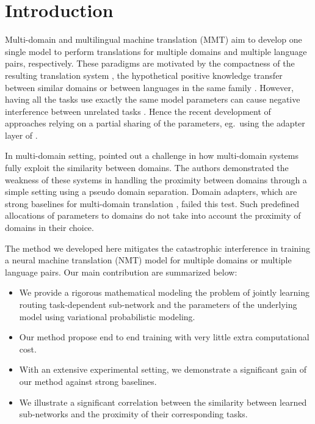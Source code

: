 \documentclass[11pt]{article}
\begin{document}
\section{Introduction}
Multi-domain and multilingual machine translation (MMT) aim to develop one single model to perform translations for multiple domains and multiple language pairs, respectively. These paradigms are motivated by the compactness of the resulting translation system \citep{dabre20survey,Chu18multilingual}, the hypothetical positive knowledge transfer between similar domains \citep{Pham21revisiting} or between languages in the same family \citep{Tan19multilingual}. However, having all the tasks use exactly the same model parameters can cause negative interference between unrelated tasks \citep{conneau20unsupervised,wang20negative}. Hence the recent development of approaches relying on a partial sharing of the parameters, eg.\ using the adapter layer of \citet{Bapna19simple,houlsby19parameter,Pham20Study}. 

In multi-domain setting, \citet{Pham21revisiting} pointed out a challenge in how multi-domain systems fully exploit the similarity between domains. The authors demonstrated the weakness of these systems in handling the proximity between domains through a simple setting using a pseudo domain separation. Domain adapters, which are strong baselines for multi-domain translation \cite{Pham20Study}, failed this test. Such predefined allocations of parameters to domains do not take into account the proximity of domains in their choice.

The method we developed here mitigates the catastrophic interference in training a neural machine translation (NMT) model for multiple domains or multiple language pairs. Our main contribution are summarized below:
\begin{itemize}
\setlength{\itemsep}{1pt}
  \setlength{\parskip}{0pt}
  \setlength{\parsep}{0pt}
	\item We provide a rigorous mathematical modeling the problem of jointly learning routing task-dependent sub-network and the parameters of the underlying model using variational probabilistic modeling.
	\item Our method propose end to end training with very little extra computational cost.
	\item With an extensive experimental setting, we demonstrate a significant gain of our method against strong baselines.
	\item We illustrate a significant correlation between the similarity between learned sub-networks and the proximity of their corresponding tasks.
\end{itemize}
\end{document}
